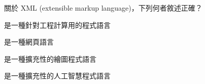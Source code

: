 \ifx\ntpcNinetyThree\undefined[93學年基北區] \fi
關於 XML (extensible markup language)，下列何者敘述正確？
  \begin{optionlist}
  \item 是一種針對工程計算用的程式語言
  \item 是一種網頁語言\label{ntpc-93-a22}
  \item 是一種擴充性的繪圖程式語言
  \item 是一種擴充性的人工智慧程式語言
  \end{optionlist}